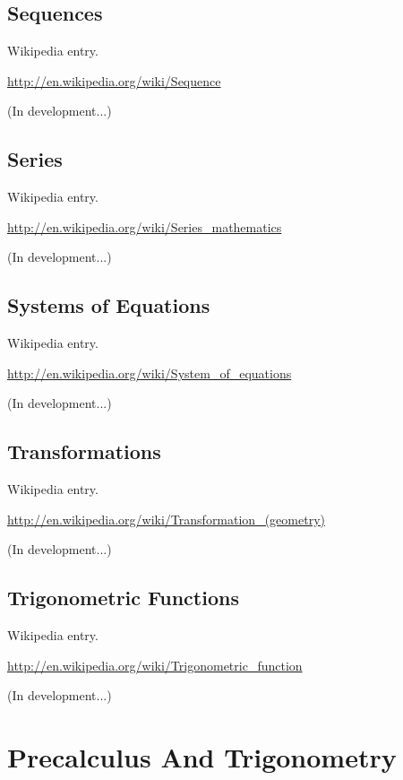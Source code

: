 \documentclass[12pt,twoside]{book}
\begin{document}
\subsection[Sequences]{Sequences}

Wikipedia entry.

\href{http://en.wikipedia.org/wiki/Sequence}{http://en.wikipedia.org/wiki/Sequence}

(In development...)

\subsection[Series]{Series}

Wikipedia entry.

\href{http://en.wikipedia.org/wiki/Series_mathematics}{http://en.wikipedia.org/wiki/Series\_mathematics}

(In development...)

\subsection[Systems of Equations]{Systems of Equations}

Wikipedia entry.

\href{http://en.wikipedia.org/wiki/System_of_equations}{http://en.wikipedia.org/wiki/System\_of\_equations}

(In development...)

\subsection[Transformations]{Transformations}

Wikipedia entry.

\href{http://en.wikipedia.org/wiki/Transformation_(geometry)}{http://en.wikipedia.org/wiki/Transformation\_(geometry)}

(In development...)

\subsection[Trigonometric Functions]{Trigonometric Functions}

Wikipedia entry.

\href{http://en.wikipedia.org/wiki/Trigonometric_function}{http://en.wikipedia.org/wiki/Trigonometric\_function}

(In development...)

\section[Precalculus And Trigonometry]{Precalculus And Trigonometry}
\end{document}
